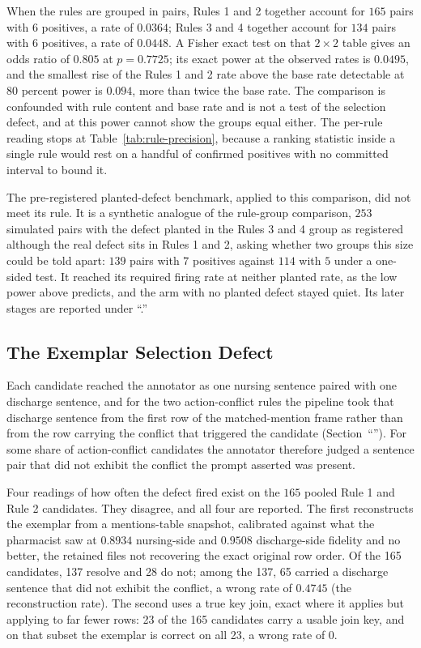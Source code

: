 When the rules are grouped in pairs, Rules 1 and 2 together account for $165$ pairs with $6$ positives, a rate of $0.0364$; Rules 3 and 4 together account for
$134$ pairs with $6$ positives, a rate of $0.0448$. A Fisher exact test on that $2 \times 2$ table
gives an odds ratio of $0.805$ at \mbox{$p = 0.7725$}; its exact power at the observed rates is $0.0495$,
and the smallest rise of the Rules 1 and 2 rate above the base rate detectable at 80 percent power is
$0.094$, more than twice the base rate. The comparison is confounded with rule content and base rate and is not a test of the
selection defect, and at this power cannot show the groups equal either. The per-rule reading stops at
Table~\ref{tab:rule-precision}, because a ranking statistic inside a single rule
would rest on a handful of confirmed positives with no committed interval to bound
it.

The pre-registered planted-defect benchmark, applied to this comparison, did not
meet its rule. It is a synthetic analogue of the rule-group comparison, $253$
simulated pairs with the defect planted in the Rules 3 and 4 group as registered
although the real defect sits in Rules 1 and 2, asking whether two groups this size
could be told apart: $139$ pairs with $7$ positives against $114$ with $5$ under a
one-sided test. It reached its required firing rate at neither planted rate, as the
low power above predicts, and the arm with no planted defect stayed quiet. Its
later stages are reported under ``.''

\subsection{The Exemplar Selection Defect}
\label{sec:r-exemplar}

Each candidate reached the annotator as one nursing sentence paired with one
discharge sentence, and for the two action-conflict rules the pipeline took that
discharge sentence from the first row of the matched-mention frame rather than from
the row carrying the conflict that triggered the candidate
(Section~``''). For some share of action-conflict candidates the annotator therefore judged a sentence pair
that did not exhibit the conflict the prompt asserted was present.

Four readings of how often the defect fired exist on the $165$ pooled Rule 1 and Rule 2
candidates. They disagree, and all four are reported. The first reconstructs the exemplar from a
mentions-table snapshot, calibrated against what the pharmacist saw at $0.8934$ nursing-side and
$0.9508$ discharge-side fidelity and no better, the retained files not recovering the exact
original row order. Of the 165 candidates, 137 resolve and 28 do not; among the 137, 65 carried a
discharge sentence that did not exhibit the conflict, a wrong rate of $0.4745$ (the reconstruction
rate). The second uses a true key join, exact where it applies but applying to far fewer rows: 23
of the 165 candidates carry a usable join key, and on that subset the exemplar is correct on all
23, a wrong rate of 0.

